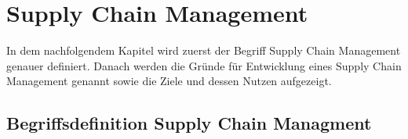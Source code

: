\section{Supply Chain Management}
In dem nachfolgendem Kapitel wird zuerst der Begriff Supply Chain Management genauer definiert. Danach werden die Gründe für Entwicklung eines Supply Chain Management genannt sowie die Ziele und dessen Nutzen aufgezeigt.

\subsection{Begriffsdefinition Supply Chain Managment}